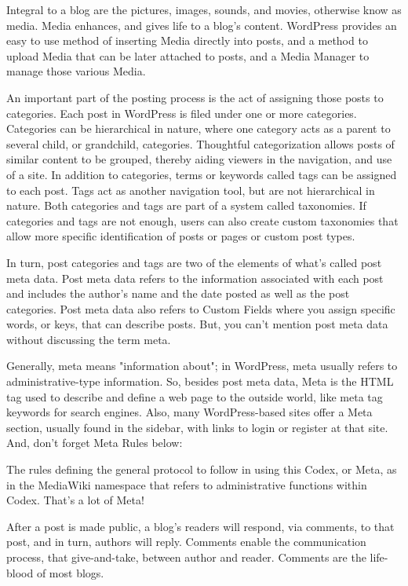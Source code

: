 Integral to a blog are the pictures, images, sounds, and movies, otherwise know as media. Media enhances, and gives life to a blog's content. WordPress provides an easy to use method of inserting Media directly into posts, and a method to upload Media that can be later attached to posts, and a Media Manager to manage those various Media.

An important part of the posting process is the act of assigning those posts to categories. Each post in WordPress is filed under one or more categories. Categories can be hierarchical in nature, where one category acts as a parent to several child, or grandchild, categories. Thoughtful categorization allows posts of similar content to be grouped, thereby aiding viewers in the navigation, and use of a site. In addition to categories, terms or keywords called tags can be assigned to each post. Tags act as another navigation tool, but are not hierarchical in nature. Both categories and tags are part of a system called taxonomies. If categories and tags are not enough, users can also create custom taxonomies that allow more specific identification of posts or pages or custom post types.

In turn, post categories and tags are two of the elements of what's called post meta data. Post meta data refers to the information associated with each post and includes the author's name and the date posted as well as the post categories. Post meta data also refers to Custom Fields where you assign specific words, or keys, that can describe posts. But, you can't mention post meta data without discussing the term meta.

Generally, meta means "information about"; in WordPress, meta usually refers to administrative-type information. So, besides post meta data, Meta is the HTML tag used to describe and define a web page to the outside world, like meta tag keywords for search engines. Also, many WordPress-based sites offer a Meta section, usually found in the sidebar, with links to login or register at that site. And, don't forget Meta Rules below:

The rules defining the general protocol to follow in using this Codex, or Meta, as in the MediaWiki namespace that refers to administrative functions within Codex. That's a lot of Meta!

After a post is made public, a blog's readers will respond, via comments, to that post, and in turn, authors will reply. Comments enable the communication process, that give-and-take, between author and reader. Comments are the life-blood of most blogs.

